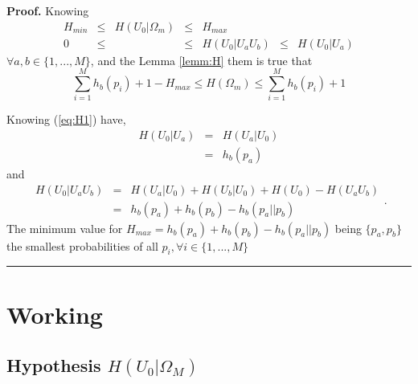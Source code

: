 \documentclass[a4paper,10pt]{article}
\newenvironment{myproof}[1][Proof]{\textbf{#1.} }{\ \rule{0.5em}{0.5em}}
\begin{document}
\begin{myproof}
 \label{proof:Hin}
 Knowing 
\begin{equation}\label{eq:Hin1}
\begin{matrix}
 H_{min} & \leq & H(U_0|\Omega_m) & \leq & H_{max}       & ~    & ~\\
 0       & \leq & ~               & \leq & H(U_0|U_aU_b) & \leq &H(U_0|U_a)
\end{matrix}
\end{equation}
$\forall a,b \in \{1, ..., M\}$, and the Lemma \ref{lemm:H} them is true that
\begin{equation}\label{eq:Hin2}
 \sum_{i=1}^{M}{h_b(p_i)}+1 -H_{max} \leq H(\Omega_m) \leq \sum_{i=1}^{M}{h_b(p_i)}+1
\end{equation}

 Knowing (\ref{eq:H1}) have,  
 \begin{equation}\label{eq:Hin4}
\begin{matrix}
 H(U_0|U_a)&=&H(U_a|U_0)\\
       ~  &=&h_b(p_a)
\end{matrix}
\end{equation}
and 
\begin{equation}\label{eq:Hin5}
\begin{matrix}
H(U_0|U_aU_b) & = & H(U_a|U_0) + H(U_b|U_0) + H(U_0)- H(U_aU_b)  \\
 ~            & = & h_b(p_a) + h_b(p_b) - h_b(p_a||p_b)
 \end{matrix}.
\end{equation}
The minimum value for $H_{max}=h_b(p_a) + h_b(p_b) - h_b(p_a||p_b)$ being 
$\{p_a,p_b\}$ the smallest probabilities of all $p_i, \forall i \in \{1, ..., M\}$ 
\end{myproof}
\section{Working}
\label{sec:working}

\subsection{Hypothesis $H(U_0|\Omega_M)$}
\label{subsec:h0OmegaM}
\end{document}
